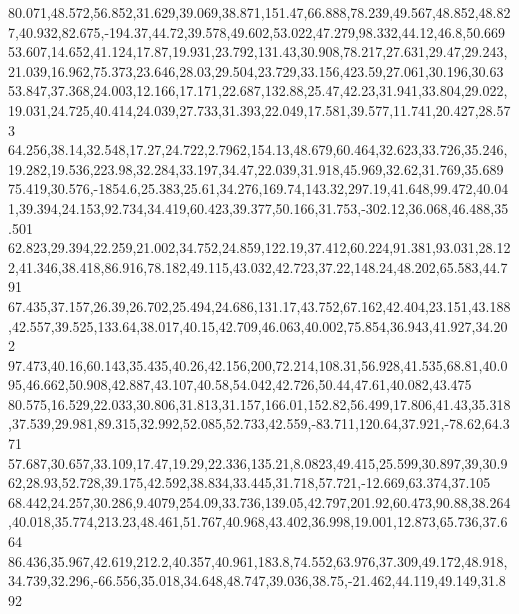 80.071,48.572,56.852,31.629,39.069,38.871,151.47,66.888,78.239,49.567,48.852,48.827,40.932,82.675,-194.37,44.72,39.578,49.602,53.022,47.279,98.332,44.12,46.8,50.669
53.607,14.652,41.124,17.87,19.931,23.792,131.43,30.908,78.217,27.631,29.47,29.243,21.039,16.962,75.373,23.646,28.03,29.504,23.729,33.156,423.59,27.061,30.196,30.63
53.847,37.368,24.003,12.166,17.171,22.687,132.88,25.47,42.23,31.941,33.804,29.022,19.031,24.725,40.414,24.039,27.733,31.393,22.049,17.581,39.577,11.741,20.427,28.573
64.256,38.14,32.548,17.27,24.722,2.7962,154.13,48.679,60.464,32.623,33.726,35.246,19.282,19.536,223.98,32.284,33.197,34.47,22.039,31.918,45.969,32.62,31.769,35.689
75.419,30.576,-1854.6,25.383,25.61,34.276,169.74,143.32,297.19,41.648,99.472,40.041,39.394,24.153,92.734,34.419,60.423,39.377,50.166,31.753,-302.12,36.068,46.488,35.501
62.823,29.394,22.259,21.002,34.752,24.859,122.19,37.412,60.224,91.381,93.031,28.122,41.346,38.418,86.916,78.182,49.115,43.032,42.723,37.22,148.24,48.202,65.583,44.791
67.435,37.157,26.39,26.702,25.494,24.686,131.17,43.752,67.162,42.404,23.151,43.188,42.557,39.525,133.64,38.017,40.15,42.709,46.063,40.002,75.854,36.943,41.927,34.202
97.473,40.16,60.143,35.435,40.26,42.156,200,72.214,108.31,56.928,41.535,68.81,40.095,46.662,50.908,42.887,43.107,40.58,54.042,42.726,50.44,47.61,40.082,43.475
80.575,16.529,22.033,30.806,31.813,31.157,166.01,152.82,56.499,17.806,41.43,35.318,37.539,29.981,89.315,32.992,52.085,52.733,42.559,-83.711,120.64,37.921,-78.62,64.371
57.687,30.657,33.109,17.47,19.29,22.336,135.21,8.0823,49.415,25.599,30.897,39,30.962,28.93,52.728,39.175,42.592,38.834,33.445,31.718,57.721,-12.669,63.374,37.105
68.442,24.257,30.286,9.4079,254.09,33.736,139.05,42.797,201.92,60.473,90.88,38.264,40.018,35.774,213.23,48.461,51.767,40.968,43.402,36.998,19.001,12.873,65.736,37.664
86.436,35.967,42.619,212.2,40.357,40.961,183.8,74.552,63.976,37.309,49.172,48.918,34.739,32.296,-66.556,35.018,34.648,48.747,39.036,38.75,-21.462,44.119,49.149,31.892
